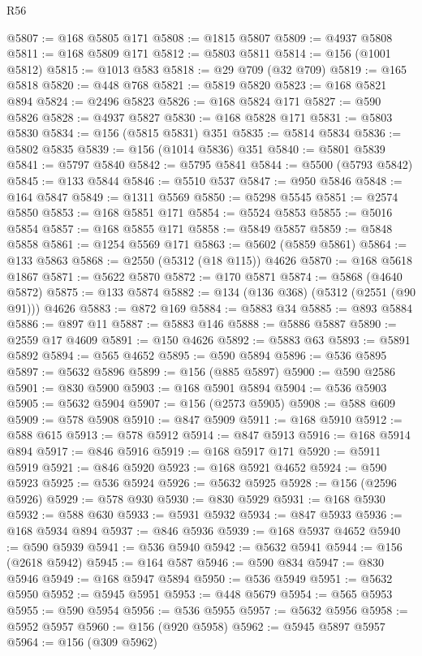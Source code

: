\begin{lexlean}{R56}
\begin{coremodule}
@5807 := @168 @5805 @171
@5808 := @1815 @5807
@5809 := @4937 @5808
@5811 := @168 @5809 @171
@5812 := @5803 @5811
@5814 := @156 (@1001 @5812)
@5815 := @1013 @583
@5818 := @29 @709 (@32 @709)
@5819 := @165 @5818
@5820 := @448 @768
@5821 := @5819 @5820
@5823 := @168 @5821 @894
@5824 := @2496 @5823
@5826 := @168 @5824 @171
@5827 := @590 @5826
@5828 := @4937 @5827
@5830 := @168 @5828 @171
@5831 := @5803 @5830
@5834 := @156 (@5815 @5831) @351
@5835 := @5814 @5834
@5836 := @5802 @5835
@5839 := @156 (@1014 @5836) @351
@5840 := @5801 @5839
@5841 := @5797 @5840
@5842 := @5795 @5841
@5844 := @5500 (@5793 @5842)
@5845 := @133 @5844
@5846 := @5510 @537
@5847 := @950 @5846
@5848 := @164 @5847
@5849 := @1311 @5569
@5850 := @5298 @5545
@5851 := @2574 @5850
@5853 := @168 @5851 @171
@5854 := @5524 @5853
@5855 := @5016 @5854
@5857 := @168 @5855 @171
@5858 := @5849 @5857
@5859 := @5848 @5858
@5861 := @1254 @5569 @171
@5863 := @5602 (@5859 @5861)
@5864 := @133 @5863
@5868 := @2550 (@5312 (@18 @115)) @4626
@5870 := @168 @5618 @1867
@5871 := @5622 @5870
@5872 := @170 @5871
@5874 := @5868 (@4640 @5872)
@5875 := @133 @5874
@5882 := @134 (@136 @368) (@5312 (@2551 (@90 @91))) @4626
@5883 := @872 @169
@5884 := @5883 @34
@5885 := @893 @5884
@5886 := @897 @11
@5887 := @5883 @146
@5888 := @5886 @5887
@5890 := @2559 @17 @4609
@5891 := @150 @4626
@5892 := @5883 @63
@5893 := @5891 @5892
@5894 := @565 @4652
@5895 := @590 @5894
@5896 := @536 @5895
@5897 := @5632 @5896
@5899 := @156 (@885 @5897)
@5900 := @590 @2586
@5901 := @830 @5900
@5903 := @168 @5901 @5894
@5904 := @536 @5903
@5905 := @5632 @5904
@5907 := @156 (@2573 @5905)
@5908 := @588 @609
@5909 := @578 @5908
@5910 := @847 @5909
@5911 := @168 @5910
@5912 := @588 @615
@5913 := @578 @5912
@5914 := @847 @5913
@5916 := @168 @5914 @894
@5917 := @846 @5916
@5919 := @168 @5917 @171
@5920 := @5911 @5919
@5921 := @846 @5920
@5923 := @168 @5921 @4652
@5924 := @590 @5923
@5925 := @536 @5924
@5926 := @5632 @5925
@5928 := @156 (@2596 @5926)
@5929 := @578 @930
@5930 := @830 @5929
@5931 := @168 @5930
@5932 := @588 @630
@5933 := @5931 @5932
@5934 := @847 @5933
@5936 := @168 @5934 @894
@5937 := @846 @5936
@5939 := @168 @5937 @4652
@5940 := @590 @5939
@5941 := @536 @5940
@5942 := @5632 @5941
@5944 := @156 (@2618 @5942)
@5945 := @164 @587
@5946 := @590 @834
@5947 := @830 @5946
@5949 := @168 @5947 @5894
@5950 := @536 @5949
@5951 := @5632 @5950
@5952 := @5945 @5951
@5953 := @448 @5679
@5954 := @565 @5953
@5955 := @590 @5954
@5956 := @536 @5955
@5957 := @5632 @5956
@5958 := @5952 @5957
@5960 := @156 (@920 @5958)
@5962 := @5945 @5897 @5957
@5964 := @156 (@309 @5962)

\end{coremodule}
\end{lexlean}
